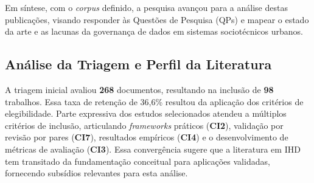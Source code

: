 \documentclass[12pt]{article}
\begin{document}
Em síntese, com o \textit{corpus} definido, a pesquisa avançou para a análise destas publicações, visando responder às Questões de Pesquisa (QPs) e mapear o estado da arte e as lacunas da governança de dados em sistemas sociotécnicos urbanos.

\subsection{Análise da Triagem e Perfil da Literatura}




A triagem inicial avaliou \textbf{268} documentos, resultando na inclusão de \textbf{98} trabalhos. Essa taxa de retenção de 36,6\% resultou da aplicação dos critérios de elegibilidade. Parte expressiva dos estudos selecionados atendeu a múltiplos critérios de inclusão, articulando \textit{frameworks} práticos (\textbf{CI2}), validação por revisão por pares (\textbf{CI7}), resultados empíricos (\textbf{CI4}) e o desenvolvimento de métricas de avaliação (\textbf{CI3}). Essa convergência sugere que a literatura em IHD tem transitado da fundamentação conceitual para aplicações validadas, fornecendo subsídios relevantes para esta análise.
\end{document}

